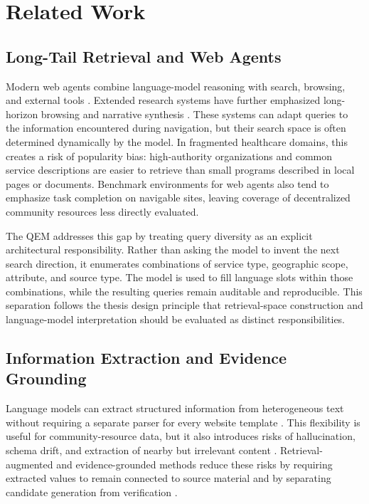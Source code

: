 \documentclass[journal,article,submit,moreauthors]{Definitions/mdpi}
\begin{document}
\section{Related Work}

\subsection{Long-Tail Retrieval and Web Agents}
Modern web agents combine language-model reasoning with search, browsing, and external tools \citep{toolformer2023,gorilla2023,toolllm2023,webvoyager2024,autogen2023,babyagi2023}. Extended research systems have further emphasized long-horizon browsing and narrative synthesis \citep{deepresearch2025,gemini2024,claude2024}. These systems can adapt queries to the information encountered during navigation, but their search space is often determined dynamically by the model. In fragmented healthcare domains, this creates a risk of popularity bias: high-authority organizations and common service descriptions are easier to retrieve than small programs described in local pages or documents. Benchmark environments for web agents also tend to emphasize task completion on navigable sites, leaving coverage of decentralized community resources less directly evaluated.

The QEM addresses this gap by treating query diversity as an explicit architectural responsibility. Rather than asking the model to invent the next search direction, it enumerates combinations of service type, geographic scope, attribute, and source type. The model is used to fill language slots within those combinations, while the resulting queries remain auditable and reproducible. This separation follows the thesis design principle that retrieval-space construction and language-model interpretation should be evaluated as distinct responsibilities.

\subsection{Information Extraction and Evidence Grounding}
Language models can extract structured information from heterogeneous text without requiring a separate parser for every website template \citep{qiu2020,lample2016,healthcare_survey2025,llm_survey2023,abdulnazar2024}. This flexibility is useful for community-resource data, but it also introduces risks of hallucination, schema drift, and extraction of nearby but irrelevant content \citep{ji2023hallucination}. Retrieval-augmented and evidence-grounded methods reduce these risks by requiring extracted values to remain connected to source material and by separating candidate generation from verification \citep{lewis2020rag,gero2023,dhuliawala2023}.
\end{document}
